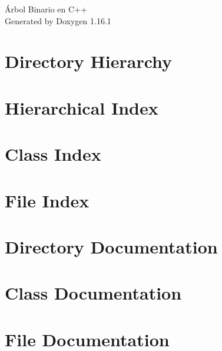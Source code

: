 \documentclass[twoside]{book}
\newcommand{\+}{\discretionary{\mbox{\scriptsize$\hookleftarrow$}}{}{}}
\newcommand{\clearemptydoublepage}{%
    \newpage{\pagestyle{empty}\cleardoublepage}%
  }
\begin{document}
  \raggedbottom
    \hypersetup{pageanchor=false,
                bookmarksnumbered=true,
                pdfencoding=unicode
               }
  \begin{titlepage}
  \vspace*{7cm}
  \begin{center}%
  {\Large Árbol Binario en C++}\\
  \vspace*{1cm}
  {\large Generated by Doxygen 1.16.1}\\
  \end{center}
  \end{titlepage}
  \clearemptydoublepage
  \tableofcontents
  \clearemptydoublepage
  \hypersetup{pageanchor=true}


\chapter{Directory Hierarchy}

\chapter{Hierarchical Index}

\chapter{Class Index}

\chapter{File Index}

\chapter{Directory Documentation}


\chapter{Class Documentation}



\chapter{File Documentation}













  \backmatter
  \newpage
  \clearemptydoublepage
  \printindex
\end{document}
